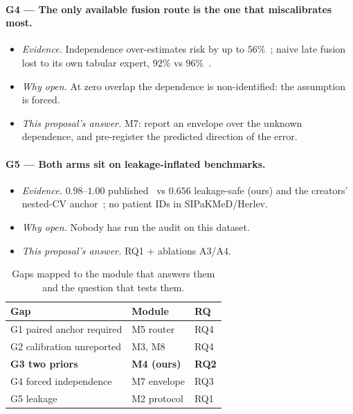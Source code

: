 \documentclass[sigplan,nonacm,screen]{acmart}
\begin{document}
\paragraph{G4 --- The only available fusion route is the one that miscalibrates most.}
\begin{itemize}
  \item \emph{Evidence.} Independence over-estimates risk by up to $56\%$~\cite{grill2017comparison}; naive late fusion lost to its own tabular expert, $92\%$ vs $96\%$~\cite{kelebet2025multimodal}.
  \item \emph{Why open.} At zero overlap the dependence is non-identified: the assumption is forced.
  \item \emph{This proposal's answer.} M7: report an envelope over the unknown dependence, and pre-register the predicted direction of the error.
\end{itemize}

\paragraph{G5 --- Both arms sit on leakage-inflated benchmarks.}
\begin{itemize}
  \item \emph{Evidence.} $0.98$--$1.00$ published~\cite{roy2025interpretable} vs $0.656$ leakage-safe (ours) and the creators' nested-CV anchor~\cite{fernandes2018supervised}; no patient IDs in SIPaKMeD/Herlev.
  \item \emph{Why open.} Nobody has run the audit on this dataset.
  \item \emph{This proposal's answer.} RQ1 + ablations A3/A4.
\end{itemize}

\begin{table}[t]
\caption{Gaps mapped to the module that answers them and the question that tests them.}
\label{tab:gapmap}
\footnotesize
\setlength{\tabcolsep}{4pt}
\begin{tabular}{@{}llp{2.1cm}@{}}
\toprule
\textbf{Gap} & \textbf{Module} & \textbf{RQ} \\
\midrule
G1 paired anchor required & M5 router & RQ4 \\
G2 calibration unreported & M3, M8 & RQ4 \\
\textbf{G3 two priors} & \textbf{M4 (ours)} & \textbf{RQ2} \\
G4 forced independence & M7 envelope & RQ3 \\
G5 leakage & M2 protocol & RQ1 \\
\bottomrule
\end{tabular}
\end{table}
\end{document}
